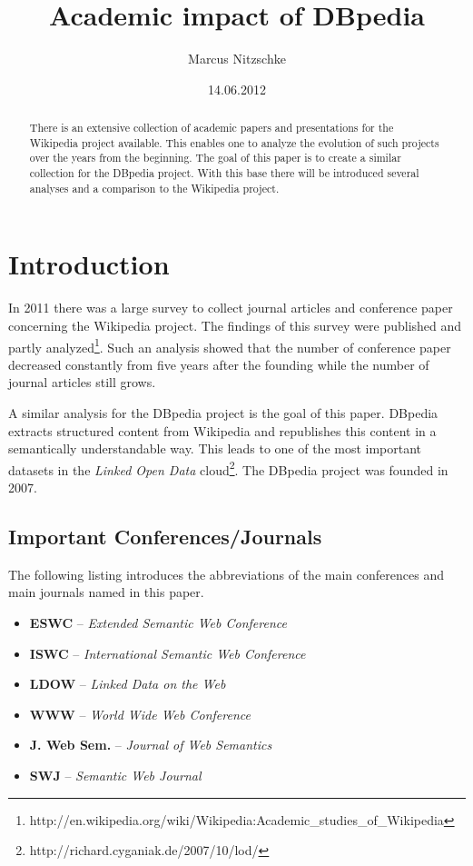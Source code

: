 \documentclass[english]{lni}
\title{Academic impact of DBpedia}
\author{Marcus Nitzschke}
\date{14.06.2012}
\begin{document}
\maketitle


\begin{abstract} 
There is an extensive collection of academic papers and presentations for the
Wikipedia project available. This enables one to analyze the evolution of such
projects over the years from the beginning. The goal of this paper is to create a
similar collection for the DBpedia project. With this base there will be
introduced several analyses and a comparison to the Wikipedia project.
\end{abstract}

\section{Introduction}
\label{sec-1}

  In 2011 there was a large survey to collect journal articles and conference
  paper concerning the Wikipedia project. The findings of this survey were published
  and partly analyzed\footnote{http://en.wikipedia.org/wiki/Wikipedia:Academic\_{}studies\_{}of\_{}Wikipedia }. Such an analysis showed that the number of
  conference paper decreased constantly from five years after the founding
  while the number of journal articles still grows.

  A similar analysis for the DBpedia project is the goal of this paper. DBpedia
  extracts structured content from Wikipedia and republishes this content in a
  semantically understandable way. This leads to one of the most important datasets in the
  \emph{Linked Open Data} cloud\footnote{http://richard.cyganiak.de/2007/10/lod/ }. The DBpedia project was founded in 2007.
\subsection{Important Conferences/Journals}
\label{sec-1-1}

  The following listing introduces the abbreviations of the main conferences and
  main journals named in this paper.
\begin{itemize}
\item \textbf{ESWC} -- \emph{Extended Semantic Web Conference}
\item \textbf{ISWC} -- \emph{International Semantic Web Conference}
\item \textbf{LDOW} -- \emph{Linked Data on the Web}
\item \textbf{WWW} -- \emph{World Wide Web Conference}
\item \textbf{J. Web Sem.} -- \emph{Journal of Web Semantics}
\item \textbf{SWJ} -- \emph{Semantic Web Journal}
\end{itemize}
\end{document}
